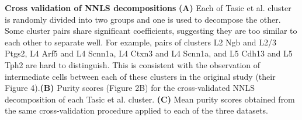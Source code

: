 \textbf{Cross validation of NNLS decompositions}
\textbf{(A)} Each of Tasic et al. cluster is randomly divided into two groups and one is used to decompose the other. Some cluster pairs share significant coefficients, suggesting they are too similar to each other to separate well. For example, pairs of clusters L2 Ngb and L2/3 Ptgs2, L4 Arf5 and L4 Scnn1a, L4 Ctxn3 and L4 Scnn1a, and L5 Cdh13 and L5 Tph2 are hard to distinguish. This is consistent with the observation of intermediate cells between each of these clusters in the original study (their Figure 4).\textbf{(B)} Purity scores (Figure 2B) for the cross-validated NNLS decomposition of each Tasic et al. cluster. \textbf{(C)} Mean purity scores obtained from the same cross-validation procedure applied to each of the three datasets. 
